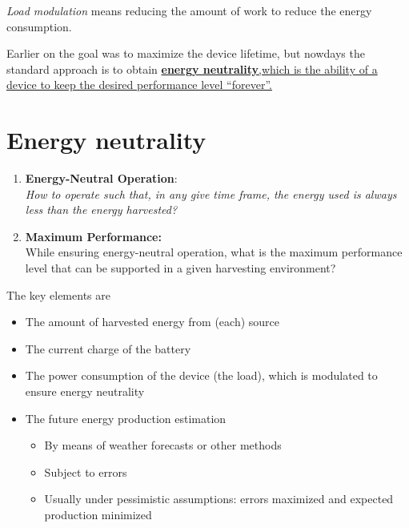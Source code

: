 \textit{Load modulation} means reducing the amount of work
to reduce the energy consumption.

Earlier on the goal was to maximize the device lifetime, but nowdays the standard approach is to obtain \ul{\textbf{energy neutrality},which is the ability of a device to keep the desired performance level ``forever''.} 
\newpage

\section{Energy neutrality}
\begin{enumerate}
   \item \textbf{Energy-Neutral Operation}:\\
   \textit{How to operate such that, in any give time frame,
   the energy used is always less than the energy harvested?}
   \item \textbf{Maximum Performance:}\\
   While ensuring energy-neutral operation, what is the maximum performance level that can be supported in a given harvesting environment?
\end{enumerate}

The key elements are
\begin{itemize}
   \item The amount of harvested energy from (each) source
   \item The current charge of the battery
   \item The power consumption of the device (the load), which is modulated to ensure energy neutrality
   \item The future energy production estimation
   \begin{itemize}
      \item By means of weather forecasts or other
      methods
      \item Subject to errors
      \item Usually under pessimistic assumptions: errors maximized and expected production minimized
   \end{itemize}
\end{itemize}

